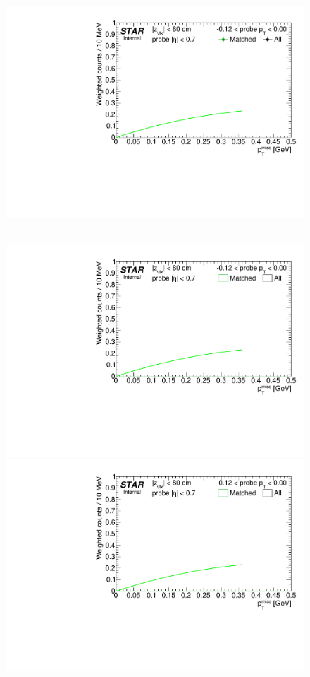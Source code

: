 \begin{figure}[ht]
{  \includegraphics[width=\linewidth,page=9]{graphics/correctionsToEff/TOF_tagAndProbe/Fitting_effVsPt_data.CPT.pdf}
}~
\parbox{0.495\textwidth}{
  \centering
  \includegraphics[width=\linewidth,page=7]{graphics/correctionsToEff/TOF_tagAndProbe/Fitting_effVsPt_mc.CPT.pdf}\\
  \includegraphics[width=\linewidth,page=8]{graphics/correctionsToEff/TOF_tagAndProbe/Fitting_effVsPt_mc.CPT.pdf}\\
}
\end{figure}
